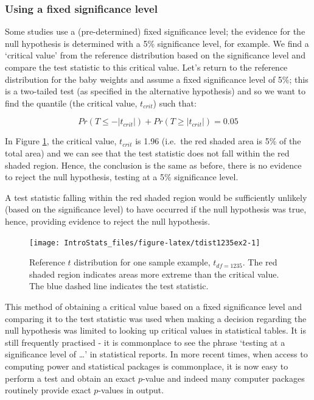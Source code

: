 \documentclass[
  oneside]{krantz}
\begin{document}
\hypertarget{using-a-fixed-significance-level}{%
\subsubsection{Using a fixed significance level}\label{using-a-fixed-significance-level}}

Some studies use a (pre-determined) fixed significance level; the evidence for the null hypothesis is determined with a 5\% significance level, for example. We find a `critical value' from the reference distribution based on the significance level and compare the test statistic to this critical value. Let's return to the reference distribution for the baby weights and assume a fixed significance level of 5\%; this is a two-tailed test (as specified in the alternative hypothesis) and so we want to find the quantile (the critical value, \(t_{crit}\)) such that:

\[Pr(T \le -|t_{crit}|) + Pr(T \ge |t_{crit}|) = 0.05\]

In Figure \ref{fig:tdist1235ex2}, the critical value, \(t_{crit}\) is 1.96 (i.e.~the red shaded area is 5\% of the total area) and we can see that the test statistic does not fall within the red shaded region. Hence, the conclusion is the same as before, there is no evidence to reject the null hypothesis, testing at a 5\% significance level.

A test statistic falling within the red shaded region would be sufficiently unlikely (based on the significance level) to have occurred if the null hypothesis was true, hence, providing evidence to reject the null hypothesis.

\begin{figure}[!htb]

{\centering \texttt{[image: IntroStats\_files/figure-latex/tdist1235ex2-1]} 

}

\caption{Reference $t$ distribution for one sample example, $t_{df=1235}$. The red shaded region indicates areas more extreme than the critical value. The blue dashed line indicates the test statistic.}\label{fig:tdist1235ex2}
\end{figure}

This method of obtaining a critical value based on a fixed significance level and comparing it to the test statistic was used when making a decision regarding the null hypothesis was limited to looking up critical values in statistical tables. It is still frequently practised - it is commonplace to see the phrase `testing at a significance level of \ldots{}' in statistical reports. In more recent times, when access to computing power and statistical packages is commonplace, it is now easy to perform a test and obtain an exact \(p\)-value and indeed many computer packages routinely provide exact \(p\)-values in output.
\end{document}

